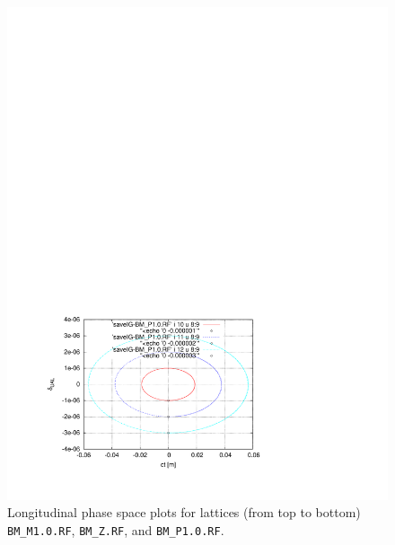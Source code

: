 \documentclass[]{article}
\begin{document}
\begin{figure}[h]
\begin{minipage}{\linewidth}
\includegraphics[scale=0.8]{pdf/LongitPhSp_BM_P1p0.pdf}
\end{minipage}
\caption{\label{fig:LongitPhSp_BM_P1.0}
Longitudinal phase space plots for 
lattices (from top to bottom)
{\tt BM\_M1.0.RF}, {\tt BM\_Z.RF}, and {\tt BM\_P1.0.RF}.
}
\end{figure}
%
\end{document}
